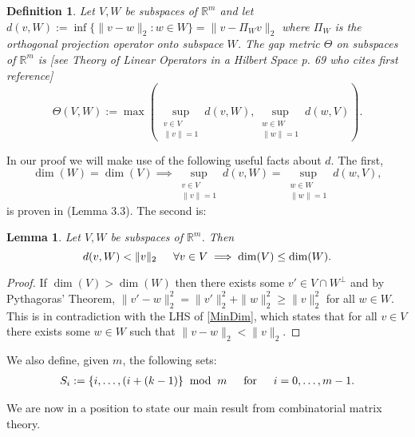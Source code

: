 \documentclass[journal, onecolumn]{IEEEtran}
\newtheorem{lemma}{Lemma}
\newtheorem{definition}{Definition}
\begin{document}
\begin{definition}
Let $V, W$ be subspaces of $\mathbb{R}^m$ and let $d(v,W) := \inf\{\|v-w\|_2: w \in W\} = \|v - \Pi_W v\|_2$ where $\Pi_W$ is the orthogonal projection operator onto subspace $W$. The \emph{gap} metric $\Theta$ on subspaces of $\mathbb{R}^{m}$ is [see Theory of Linear Operators in a Hilbert Space p. 69 who cites first reference]
\begin{equation}\label{SubspaceMetric}
\Theta(V,W) := \max\left( \sup_{\substack{v \in V \\ \|v\| = 1}} d(v,W), \sup_{\substack{w \in W \\ \|w\| = 1}} d(w,V) \right).
\end{equation}
\end{definition}
%
In our proof we will make use of the following useful facts about $d$. The first, 
\begin{equation}\label{SubspaceMetricSameDim}
\dim(W) = \dim(V) \implies \sup_{\substack{v \in V \\ \|v\| = 1}}  d(v,W)  = \sup_{\substack{w \in W \\ \|w\| = 1}} d(w,V),
\end{equation}
%
is proven in \cite{Morris10} (Lemma 3.3). The second is:
\begin{lemma}\label{MinDimLemma}
Let $V, W$ be subspaces of $\mathbb{R}^{m}$. Then
\begin{equation}\label{MinDim}
d(v,W) < \|v\|_2 \indent \forall v \in V \implies \dim(V) \leq \dim(W).
\end{equation}
\end{lemma}

\begin{proof}
If $\dim(V) > \dim(W)$ then there exists some $v' \in V \cap W^\perp$ and by Pythagoras' Theorem, $\|v' - w\|_2^2 = \|v'\|_2^2 + \|w\|_2^2 \geq \|v\|_2^2$ for all $w \in W$. This is in contradiction with the LHS of \eqref{MinDim}, which states that for all $v \in V$ there exists some $w \in W$ such that $\|v - w\|_2 < \|v\|_2$.
\end{proof}

We also define, given $m$, the following sets:
\begin{align}\label{Sdef}
S_i := \{i, \ldots, (i + (k-1) \} \;\bmod\; m \indent \text{for} \indent i = 0, \ldots, m-1.
\end{align}

We are now in a position to state our main result from combinatorial matrix theory.

\end{document}
